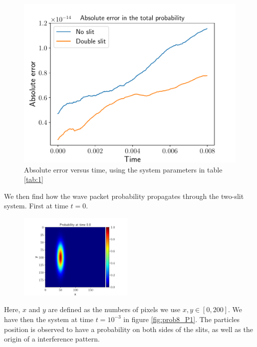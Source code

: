 \documentclass[english,notitlepage,reprint,nofootinbib]{revtex4-2}  %
\begin{document}
	\begin{figure}[h!]
		\centering
		\includegraphics[scale=0.55]{figures/problem7_error.pdf}
		\caption{Absolute error versus time, using the system parameters in table \ref{tab:1}}
		\label{fig:prob7_error}
	\end{figure}
	We then find how the wave packet probability propagates through the two-slit system. First at time $t=0$.

	\begin{figure}[h!]
		\centering
		\includegraphics[trim={1cm 0cm 1cm 0cm},clip,width=0.49\textwidth]{figures/prob_plot_0.0.pdf}
		\caption{}
		\label{fig:prob_P0}
	\end{figure}
	Here, $x$ and $y$ are defined as the numbers of pixels we use $x, y\in[0, 200]$. We have then the system at time $t = 10^{-3}$ in figure \ref{fig:prob8_P1}. The particles position is observed to have a probability on both sides of the slits, as well as the origin of a interference pattern.
\end{document}
